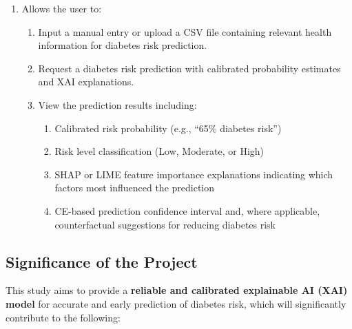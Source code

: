 \begin{enumerate}
    \item Allows the user to:
    \begin{enumerate}
        \item Input a manual entry or upload a CSV file containing relevant health information for diabetes risk prediction.
        \item Request a diabetes risk prediction with calibrated probability estimates and XAI explanations.
        \item View the prediction results including:
        \begin{enumerate}
            \item Calibrated risk probability (e.g., ``65\% diabetes risk'')
            \item Risk level classification (Low, Moderate, or High)
            \item SHAP or LIME feature importance explanations indicating which factors most influenced the prediction
            \item CE-based prediction confidence interval and, where applicable, counterfactual suggestions for reducing diabetes risk
        \end{enumerate}
    \end{enumerate}
\end{enumerate}


\subsection{Significance of the Project}

This study aims to provide a \textbf{reliable and calibrated explainable AI (XAI) model} for accurate and early prediction of diabetes risk, which will significantly contribute to the following:

